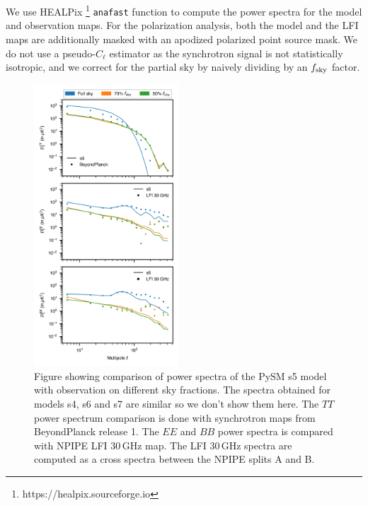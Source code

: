 \documentclass[twocolumn]{aastex631}
\begin{document}
We use HEALPix \footnote{https://healpix.sourceforge.io} \texttt{anafast} function \citep{2005ApJ...622..759G, 2019JOSS....4.1298Z}  to compute the power spectra for the model and observation maps. For the polarization analysis, both the model and the LFI maps are additionally masked with an apodized polarized point source mask. We do not use a pseudo-$C_\ell$ estimator as the synchrotron signal is not statistically isotropic, and we correct for the partial sky by naively dividing by an $f_{\rm sky}$ factor.

\begin{figure}
    \centering
    \includegraphics[width=0.48\textwidth]{figures/Dlcomp_PySM3-4b7_s5_vs_BPnLFI30_BPI.png}
    \caption{Figure showing comparison of power spectra of the PySM s5 model with observation on different sky fractions. The spectra obtained for models s4, s6 and s7 are similar so we don't show them here. The $TT$ power spectrum comparison is done with synchrotron maps from BeyondPlanck release 1. The $EE$ and $BB$ power spectra is compared with NPIPE LFI 30\,GHz map. The LFI 30\,GHz spectra are computed as a cross spectra between the NPIPE splits A and B.}
    \label{fig:Dl_sync_galmask}
\end{figure}
\end{document}
